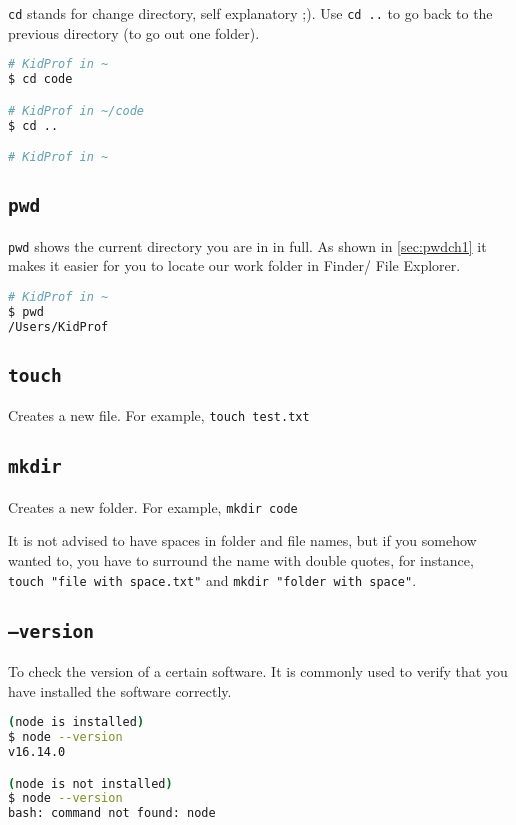\texttt{cd} stands for change directory, self explanatory ;). Use \texttt{cd ..} to go back to the previous directory (to go out one folder). 
\vspace{6mm}

\begin{lstlisting}[language=bash]
# KidProf in ~
$ cd code

# KidProf in ~/code
$ cd ..

# KidProf in ~
\end{lstlisting}

\subsection{\texttt{pwd}}

\texttt{pwd} shows the current directory you are in in full. As shown in \cref{sec:pwdch1} it makes it easier for you to locate our work folder in Finder/ File Explorer.
\vspace{6mm}

\begin{lstlisting}[language=bash]
# KidProf in ~
$ pwd
/Users/KidProf
\end{lstlisting}

\subsection{\texttt{touch}}

Creates a new file. For example, \texttt{touch test.txt}

\subsection{\texttt{mkdir}}

Creates a new folder. For example, \texttt{mkdir code}
\vspace{6mm}

It is not advised to have spaces in folder and file names, but if you somehow wanted to, you have to surround the name with double quotes, for instance, \texttt{touch "file with space.txt"} and \texttt{mkdir "folder with space"}.
\subsection{\texttt{--version}}

To check the version of a certain software. It is commonly used to verify that you have installed the software correctly. 

\begin{lstlisting}[language=bash]
(node is installed)
$ node --version
v16.14.0

(node is not installed)
$ node --version
bash: command not found: node
\end{lstlisting}

